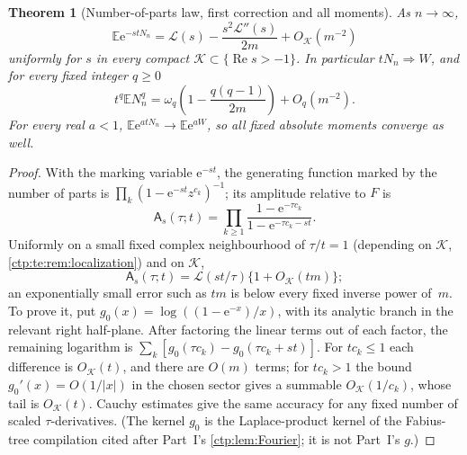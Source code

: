 \documentclass[11pt,a4paper]{article}
\numberwithin{equation}{section}
\newtheorem{theorem}{Theorem}[section]
\theoremstyle{definition}
\theoremstyle{remark}
\newcommand{\e}{\mathrm e}
\DeclareMathOperator{\Rea}{Re}
\newcommand{\E}{\mathbb E}
\newcommand{\LW}{\mathcal L}
\newcommand{\amp}{\mathsf A}
\begin{document}
\begin{theorem}[Number-of-parts law, first correction and all moments]\label{ctp:te:thm:length}
As $n\to\infty$,
\begin{equation}\label{ctp:te:eq:length-first}
 \E\e^{-stN_n}=\LW(s)-\frac{s^2\LW''(s)}{2m}+O_{\mathcal K}(m^{-2})
\end{equation}
uniformly for $s$ in every compact $\mathcal K\subset\{\Rea s>-1\}$. In
particular $tN_n\Rightarrow W$, and for every fixed integer $q\ge0$
\begin{equation}\label{ctp:te:eq:moments}
 t^q\E N_n^q=\omega_q\left(1-\frac{q(q-1)}{2m}\right)+O_q(m^{-2}).
\end{equation}
For every real $a<1$, $\E\e^{atN_n}\to\E\e^{aW}$, so all fixed absolute
moments converge as well.
\end{theorem}
\begin{proof}
With the marking variable $\e^{-st}$, the generating function marked by the
number of parts is $\prod_k(1-\e^{-st}z^{c_k})^{-1}$; its amplitude
relative to $F$ is
\begin{equation}\label{ctp:te:eq:length-amplitude}
 \amp_s(\tau;t)=\prod_{k\ge1}\frac{1-\e^{-\tau c_k}}{1-\e^{-\tau c_k-st}}.
\end{equation}
Uniformly on a small fixed complex neighbourhood of $\tau/t=1$ (depending
on $\mathcal K$, \cref{ctp:te:rem:localization}) and on $\mathcal K$,
\begin{equation}\label{ctp:te:eq:amplitude-approx}
 \amp_s(\tau;t)=\LW(st/\tau)\{1+O_{\mathcal K}(tm)\};
\end{equation}
an exponentially small error such as $tm$ is below every fixed inverse power
of~$m$. To prove it, put $g_0(x)=\log((1-\e^{-x})/x)$, with its analytic
branch in the relevant right half-plane. After factoring the linear terms
out of each factor, the remaining logarithm is
$\sum_k[g_0(\tau c_k)-g_0(\tau c_k+st)]$. For $tc_k\le1$ each difference is
$O_{\mathcal K}(t)$, and there are $O(m)$ terms; for $tc_k>1$ the bound
$g_0'(x)=O(1/|x|)$ in the chosen sector gives a summable $O_{\mathcal K}(1/c_k)$,
whose tail is $O_{\mathcal K}(t)$. Cauchy estimates give the same accuracy for
any fixed number of scaled $\tau$-derivatives. (The kernel $g_0$ is the
Laplace-product kernel of the Fabius-tree compilation cited after
Part~I's \cref{ctp:lem:Fourier}; it is not Part~I's $g$.)


\end{proof}
\end{document}
